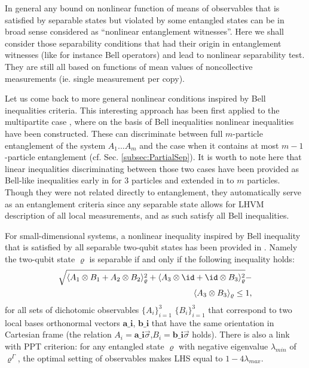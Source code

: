\documentclass[twocolumn,aps,rmp]{revtex4}
\begin{document}
In general any bound on nonlinear function of means of observables
that is satisfied by separable states but violated by some entangled
states can be in broad sense considered as ``nonlinear entanglement
witnesses''. Here we shall consider those separability conditions that
had their origin in entanglement witnesses (like for instance Bell
operators) and lead to nonlinear separability test. They are still all
based on functions of mean values of noncollective measurements
(ie. single measurement per copy).

Let us come back to more general nonlinear conditions inspired by Bell
inequalities criteria. This interesting approach has been first
applied to the multipartite case \cite{MaasssenU1988}, where on the
basis of Bell inequalities nonlinear inequalities have been
constructed.  These can discriminate between full $m$-particle
entanglement of the system $A_{1}...A_{m}$ and the case when it
contains at most $m-1$-particle entanglement
(cf. Sec. \ref{subsec:PartialSep}).  It is worth to note here that
linear inequalities discriminating between those two cases have been
provided as Bell-like inequalities early in \cite{Svetlichny1} for $3$
particles and extended in \cite{Svetlichny} to $m$ particles. Though
they were not related directly to entanglement, they automatically
serve as an entanglement criteria since any separable state allows for
LHVM description of all local measurements, and as such satisfy all
Bell inequalities.

For small-dimensional systems, a nonlinear inequality inspired by Bell
inequality that is satisfied by all separable two-qubit states has
been provided in \cite{Yu}. Namely the two-qubit state $\varrho$ is
separable if and only if the following inequality holds:
\begin{eqnarray}
\sqrt{\langle A_1\otimes B_1 + A_2\otimes B_2\rangle_{\varrho}
^{2}
+ \langle A_3\otimes \id + \id \otimes B_3\rangle^{2}_\varrho} -  \nonumber \\
\langle A_3\otimes B_3\rangle_\varrho \leq 1,
\end{eqnarray}
for all sets of
dichotomic observables $\{ A_{i} \}_{i=1}^{3}$ $\{ B_{i}
\}_{i=1}^{3}$ that correspond to two local bases orthonormal vectors
$\textbf{a_{i}}$, $\textbf{b_{i}}$ that have the same
orientation in Cartesian frame (the relation
$A_{i}=\textbf{{a}_{i}}\vec{\sigma}$,$B_{i}=\textbf{{b}_{i}}\vec{\sigma}$
holds). There is also a link with PPT criterion: for any entangled
state $\varrho$ with negative eigenvalue $\lambda_{min}$ of
$\varrho^{\Gamma}$, the optimal setting of observables makes LHS
equal to $1-4\lambda_{max}$.
\end{document}
